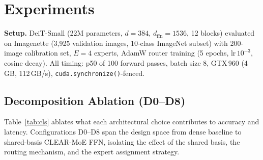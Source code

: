 \documentclass[conference]{IEEEtran}
\begin{document}
\section{Experiments}
\label{sec:results}

\textbf{Setup.} DeiT-Small (22M parameters, $d{=}384$, $d_\text{ffn}{=}1536$, 12 blocks) evaluated on Imagenette (3,925 validation images, 10-class ImageNet subset) with 200-image calibration set, $E{=}4$ experts, AdamW router training (5 epochs, lr\,$10^{-3}$, cosine decay). All timing: p50 of 100 forward passes, batch size 8, GTX\,960 (4\,GB, 112\,GB/s), \texttt{cuda.synchronize()}-fenced.

\subsection{Decomposition Ablation (D0--D8)}

Table~\ref{tab:cls} ablates what each architectural choice contributes to accuracy and latency. Configurations D0--D8 span the design space from dense baseline to shared-basis CLEAR-MoE FFN, isolating the effect of the shared basis, the routing mechanism, and the expert assignment strategy.

\begin{table}[!t]
\caption{Decomposition ablation (DeiT-Small, Imagenette, $E{=}4$, last-$k$ layers, batch=8, GTX\,960). $\Delta$Top-1 relative to D0. D4/D5 differ only in random seed. D6 and D8 are the same architecture: D6 is the cold-kernel first dispatch; D8 is measured after 3 warm-up passes (steady-state). The 21\,ms gap reflects CUDA JIT overhead on first run.}
\label{tab:cls}
\centering
\small
\setlength{\tabcolsep}{3pt}
\end{table}
\end{document}
